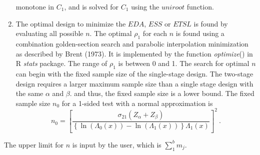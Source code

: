 \documentclass[12pt]{article}
\begin{document}
\begin{enumerate}
monotone in  $C_1$, and is solved for $C_1$ using the $uniroot$ function.
    \item
The optimal design to minimize the $EDA$, $ESS$ or $ETSL$ is found by evaluating all possible $n$.
The optimal $\rho_1$ for each $n$ is found using a combination golden-section search and parabolic
interpolation minimization as described by Brent (1973). It is implemented by the function {\it
optimize}() in R {\it stats} package. The range of $\rho_1$ is between 0 and 1. The search for
optimal $n$ can begin with the fixed sample size of the single-stage design. The two-stage design
requires a larger maximum sample size than a single stage design with the same $\alpha$ and
$\beta$. and thus, the fixed sample size is a lower bound. The fixed sample size $n_0$ for a
1-sided test with a normal approximation is
\begin{displaymath}
n_0=\left[\frac{\sigma_{21}(Z_\alpha+Z_\beta)}{\left\{\ln\left(\Lambda_0(x)\right)-\ln\left(\Lambda_1(x)\right)\right\}\Lambda_1(x)}
\right]^2 \ .
\end{displaymath}
\end{enumerate}
The upper limit for $n$ is input by the user, which is $\sum_1^b m_j$.
\end{document}
